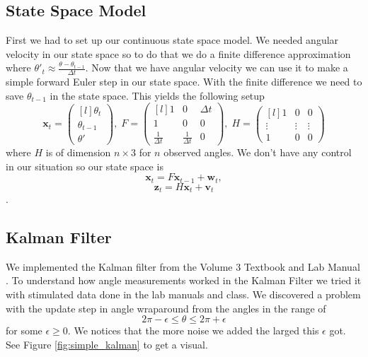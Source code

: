 \documentclass[11pt]{amsart}
\begin{document}
\subsection{State Space Model}
First we had to set up our continuous state space model. We needed angular velocity in our state space so to do that we do a finite difference approximation 
where $\theta'_t \approx \frac{\theta - \theta_{t-1}}{\Delta t}$. Now that we have angular velocity we can use it to make a simple forward Euler step in our state 
space. With the finite difference we need to save $\theta_{t-1}$ in the state space. This yields the following setup
\[\mathbf{x}_t = \begin{pmatrix*}[l]
    \theta_t \\
    \theta_{t-1} \\
    \theta'
\end{pmatrix*},\;  
F = \begin{pmatrix*}[l]
    1 & 0 & \Delta t \\
    1 & 0 & 0 \\
    \frac{1}{\Delta t} & \frac{1}{\Delta t} & 0
\end{pmatrix*},\;
H = \begin{pmatrix*}[l]
    1 & 0 & 0 \\
    \vdots & \vdots & \vdots\\
    1 & 0 & 0

\end{pmatrix*}\]
 where $H$ is of dimension $n\times3$ for $n$ observed angles. We don't have any control in our situation so our state space is
 \[\mathbf{x}_t = F\mathbf{x}_{t-1} + \mathbf{w}_t,\]
\[\mathbf{z}_t = H\mathbf{x}_t + \mathbf{v}_t\].

\subsection{Kalman Filter}
We implemented the Kalman filter from the Volume 3 Textbook \cite{V3} and Lab Manual \cite{V3 Lab Manual}. To understand how angle measurements worked in the Kalman Filter we tried it with
stimulated data done in the lab manuals and class. We discovered a problem with the update step in angle wraparound from the angles in the range of 
\[2\pi - \epsilon \leq \theta \leq 2\pi + \epsilon\] for some $\epsilon \geq 0$. We notices that the more noise we added the larged this $\epsilon$ got. 
See Figure \ref{fig:simple_kalman} to get a visual.
\end{document}
